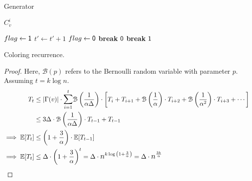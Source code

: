 \begin{algorithm}[H]
\caption{Generator}
\begin{algorithmic}[1]

            \State \Return $C^i_v$
        \EndIf
    \EndFor
\EndProcedure

                    \State $flag\gets \mathsf{1}$
                        \State $t'\gets t' + 1$
                            \State $flag\gets \mathsf{0}$
                            \State \textbf{break}
                        \EndIf
                    \EndWhile
                        \State \Return $\mathsf{0}$
                    \EndIf
                    \State \textbf{break}
               \EndIf
           \EndIf
        \EndFor
    \EndFor
    \State \Return $\mathsf{1}$
\EndProcedure

\end{algorithmic}
\label{alg:coloring}
\end{algorithm}

\begin{theorem}
\label{thm:coloring_recurrence}
Coloring recurrence.
\end{theorem}
\begin{proof}
Here, $\mathcal B(p)$ refers to the Bernoulli random variable with parameter $p$.
Assuming $t = k\log n$.
\begin{align}
T_{t} &\le \left|\Gamma(v)\right| \cdot \mathlarger\sum\limits_{i=1}^{t} \mathcal B\left( \frac{1}{\alpha\Delta}\right)\cdot
\left[ T_{i} + T_{i+1} + \mathcal B\left(\frac{1}{\alpha}\right)\cdot T_{i+2} + \mathcal B\left(\frac{1}{\alpha^2}\right)\cdot T_{i+3} + \cdots\right]\\
&\le 3\Delta \cdot \mathcal B\left(\frac{1}{\alpha\Delta}\right)\cdot T_{t-1} + T_{t-1}\\
\implies \mathbb E[T_t] &\le \left( 1 + \frac{3}{\alpha}\right)\cdot \mathbb E[T_{t-1}]\\
\implies \mathbb E[T_t] &\le \Delta\cdot \left( 1 + \frac{3}{\alpha}\right)^t = \Delta\cdot \mathlarger n^{k\log{\left(1 + \frac{3}{\alpha} \right)}}
= \Delta\cdot \mathlarger n^{\frac{3k}{\alpha}}
\end{align}
\end{proof}
